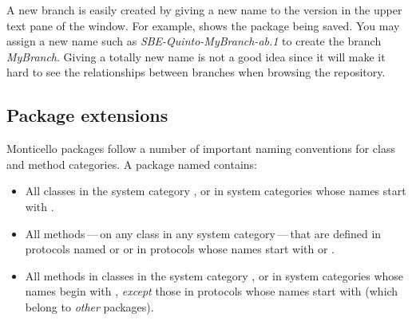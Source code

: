 \documentclass[a4paper,10pt,twoside]{book}
\begin{document}

A new branch is easily created by giving a new name to the version in the upper text pane of the  window. For example,  shows the package  being saved. You may assign a new name such as \emph{SBE-Quinto-MyBranch-ab.1} to create the branch \emph{MyBranch}. Giving a totally new name is not a good idea since it will make it hard to see the relationships between branches when browsing the repository. 


\subsection{Package extensions}

 

Monticello packages follow a number of important naming conventions for class and method categories.
A package named  contains:

\begin{itemize}
\item All classes in the system category , or in system categories whose names start with .
\item All methods\,---\,on any class in any system category\,---\,that are defined in protocols named  or  or in protocols whose names start with  or .

\item All methods in classes in the system category , or in system categories whose names begin with , \emph{except} those in protocols whose names start with \prot{*} (\ie which belong to \emph{other} packages).
\end{itemize}
\end{document}
